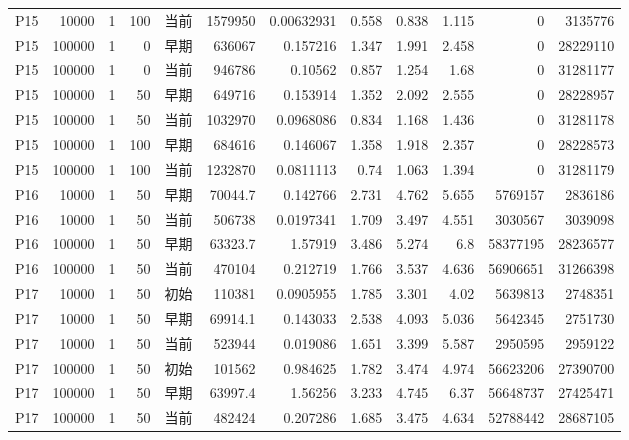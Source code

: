 \documentclass[UTF8,a4paper,10pt,twocolumn,fontset=fandol]{ctexart}
\begin{document}
\begin{longtable}{@{}lrrrlrrrrrrr@{}}
P15 & 10000 & 1 & 100 & 当前 & 1579950 & 0.00632931 & 0.558 & 0.838 & 1.115 & 0 & 3135776 \\
P15 & 100000 & 1 & 0 & 早期 & 636067 & 0.157216 & 1.347 & 1.991 & 2.458 & 0 & 28229110 \\
P15 & 100000 & 1 & 0 & 当前 & 946786 & 0.10562 & 0.857 & 1.254 & 1.68 & 0 & 31281177 \\
P15 & 100000 & 1 & 50 & 早期 & 649716 & 0.153914 & 1.352 & 2.092 & 2.555 & 0 & 28228957 \\
P15 & 100000 & 1 & 50 & 当前 & 1032970 & 0.0968086 & 0.834 & 1.168 & 1.436 & 0 & 31281178 \\
P15 & 100000 & 1 & 100 & 早期 & 684616 & 0.146067 & 1.358 & 1.918 & 2.357 & 0 & 28228573 \\
P15 & 100000 & 1 & 100 & 当前 & 1232870 & 0.0811113 & 0.74 & 1.063 & 1.394 & 0 & 31281179 \\
P16 & 10000 & 1 & 50 & 早期 & 70044.7 & 0.142766 & 2.731 & 4.762 & 5.655 & 5769157 & 2836186 \\
P16 & 10000 & 1 & 50 & 当前 & 506738 & 0.0197341 & 1.709 & 3.497 & 4.551 & 3030567 & 3039098 \\
P16 & 100000 & 1 & 50 & 早期 & 63323.7 & 1.57919 & 3.486 & 5.274 & 6.8 & 58377195 & 28236577 \\
P16 & 100000 & 1 & 50 & 当前 & 470104 & 0.212719 & 1.766 & 3.537 & 4.636 & 56906651 & 31266398 \\
P17 & 10000 & 1 & 50 & 初始 & 110381 & 0.0905955 & 1.785 & 3.301 & 4.02 & 5639813 & 2748351 \\
P17 & 10000 & 1 & 50 & 早期 & 69914.1 & 0.143033 & 2.538 & 4.093 & 5.036 & 5642345 & 2751730 \\
P17 & 10000 & 1 & 50 & 当前 & 523944 & 0.019086 & 1.651 & 3.399 & 5.587 & 2950595 & 2959122 \\
P17 & 100000 & 1 & 50 & 初始 & 101562 & 0.984625 & 1.782 & 3.474 & 4.974 & 56623206 & 27390700 \\
P17 & 100000 & 1 & 50 & 早期 & 63997.4 & 1.56256 & 3.233 & 4.745 & 6.37 & 56648737 & 27425471 \\
P17 & 100000 & 1 & 50 & 当前 & 482424 & 0.207286 & 1.685 & 3.475 & 4.634 & 52788442 & 28687105 \\
\end{longtable}
\endgroup
\end{document}
